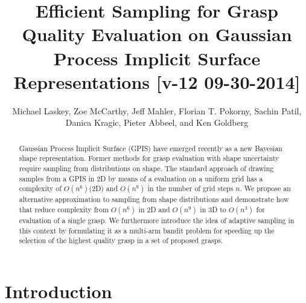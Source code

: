 \documentclass[letterpaper, 10 pt, conference]{ieeeconf}  %
\title{\LARGE \bf
Efficient Sampling for Grasp Quality Evaluation on Gaussian Process Implicit Surface Representations [v-12 09-30-2014]}
\author{Michael Laskey, Zoe McCarthy, Jeff Mahler, Florian T. Pokorny, Sachin Patil,\\  Danica Kragic, Pieter Abbeel, and Ken Goldberg}%
\begin{document}
\maketitle
\thispagestyle{empty}
\pagestyle{empty}




\begin{abstract}
Gaussian Process Implicit Surface (GPIS) have emerged recently as a new Bayesian shape representation.  %
Former methods for grasp evaluation with shape uncertainty require sampling from  distributions on shape. The standard approach of drawing samples from a GPIS in 2D by means of a %
 evaluation on a uniform grid has a complexity of $O(n^6)$(2D) and $O(n^9)$ in the number of grid steps $n$.%
We propose an alternative approximation%
 to sampling from shape distributions and demonstrate how that reduce complexity from $O(n^6)$ in 2D and $O(n^9)$ in 3D to $O(n^3)$ for evaluation of a single grasp. 
We furthermore introduce the idea of adaptive sampling in this context by formulating it as a multi-arm bandit problem for speeding up the selection of the highest quality grasp in a set of proposed grasps.  %
\end{abstract}
\section{Introduction}

\vspace{10pt}

\end{document}
